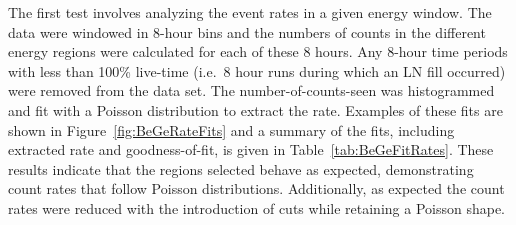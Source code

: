 	The first test involves analyzing the event rates in a given energy window.  The data were windowed in 8-hour bins and the numbers of counts in the different energy regions were calculated for each of these 8 hours.  Any 8-hour time periods with less than 100\% live-time (i.e.~8 hour runs during which an LN fill occurred) were removed from the data set.  The number-of-counts-seen was histogrammed and fit with a Poisson distribution to extract the rate.  Examples of these fits are shown in	Figure~\ref{fig:BeGeRateFits} and a summary of the fits, including extracted rate and goodness-of-fit, is given in Table~\ref{tab:BeGeFitRates}.  These results indicate that the regions selected behave as expected, demonstrating count rates that follow Poisson distributions.  Additionally, as expected the count rates were reduced with the introduction of cuts while retaining a Poisson shape.  
	
